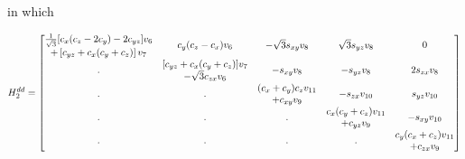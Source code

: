 \documentclass[twocolumn,showpacs,preprintnumbers,superscriptaddress,prb,floatfix,aps,10pt]{revtex4-1}
\begin{document}
in which
\begin{widetext}
\begin{equation}
H_2^{dd} =
\begin{bmatrix}
 \tfrac{1}{\sqrt{3}} [c_{x} (c_{z}-2 c_{y})-2 c_{yz}] v_{6} & \multirow{2}{*}{$c_{y} (c_{z}-c_{x}) v_{6}$}    & \multirow{2}{*}{$-\sqrt{3} s_{xy} v_{8}$} & \multirow{2}{*}{$\sqrt{3} s_{yz} v_{8}$} & \multirow{2}{*}{$0$}               \\
             +\left[c_{yz}+c_{x} (c_{y}+c_{z})\right] v_{7} &                                                 &                                           &                                          &                                    \\
\multirow{2}{*}{.}                                          &     [c_{yz}+c_{x} (c_{y}+c_{z})] v_{7}          & \multirow{2}{*}{$-s_{xy} v_{8}$}          & \multirow{2}{*}{$-s_{yz} v_{8}$}         & \multirow{2}{*}{$2 s_{zx} v_{8}$}  \\ 
                                                            &                 -\sqrt{3} c_{zx} v_{6}          &                                           &                                          &                                    \\
\multirow{2}{*}{.}                                          & \multirow{2}{*}{.}                              &      (c_{x}+c_{y}) c_{z} v_{11}           & \multirow{2}{*}{$-s_{zx} v_{10}$}        & \multirow{2}{*}{$ s_{yz} v_{10}$}  \\    
                                                            &                                                 &                  +c_{xy} v_{9}            &                                          &                                    \\
\multirow{2}{*}{.}                                          & \multirow{2}{*}{.}                              & \multirow{2}{*}{.}                        &      c_{x} (c_{y}+c_{z}) v_{11}          & \multirow{2}{*}{$-s_{xy} v_{10}$}  \\
                                                            &                                                 &                                           &                  +c_{yz} v_{9}           &                                    \\
\multirow{2}{*}{.}                                          & \multirow{2}{*}{.}                              & \multirow{2}{*}{.}                        & \multirow{2}{*}{.}                       &      c_{y} (c_{x}+c_{z}) v_{11}    \\
                                                            &                                                 &                                           &                                          &                  +c_{zx} v_{9}     \\
\end{bmatrix}
\end{equation}
\end{widetext}
\end{document}
